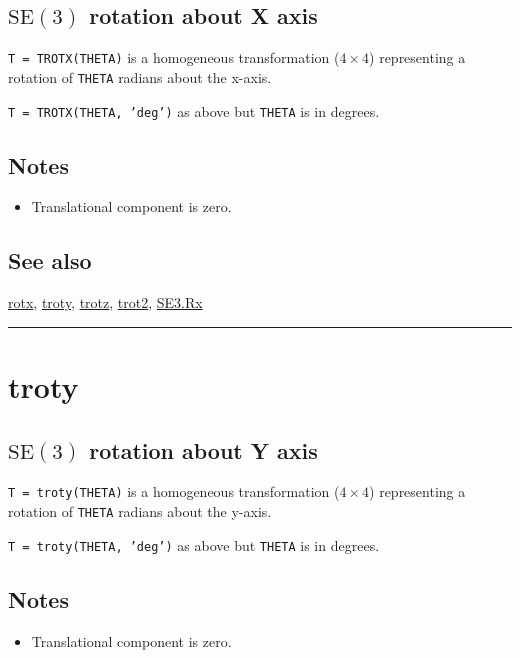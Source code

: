 \subsection*{$\mbox{SE}(3)$ rotation about X axis}


\texttt{T = TROTX(THETA)} is a homogeneous transformation ($4 \times 4$) representing a rotation
of \texttt{THETA} radians about the x-axis.



\texttt{T = TROTX(THETA, 'deg')} as above but \texttt{THETA} is in degrees.


\subsection*{Notes}
\begin{itemize}
  \item Translational component is zero.
\end{itemize}

\subsection*{See also}


\hyperlink{rotx}{\color{blue} rotx}, \hyperlink{troty}{\color{blue} troty}, \hyperlink{trotz}{\color{blue} trotz}, \hyperlink{trot2}{\color{blue} trot2}, \hyperlink{SE3.Rx}{\color{blue} SE3.Rx}

\vspace{1.5ex}\rule{\textwidth}{1mm}

\hypertarget{troty}{\section*{troty}}
\subsection*{$\mbox{SE}(3)$ rotation about Y axis}


\texttt{T = troty(THETA)} is a homogeneous transformation ($4 \times 4$) representing a rotation
of \texttt{THETA} radians about the y-axis.



\texttt{T = troty(THETA, 'deg')} as above but \texttt{THETA} is in degrees.


\subsection*{Notes}
\begin{itemize}
  \item Translational component is zero.
\end{itemize}

